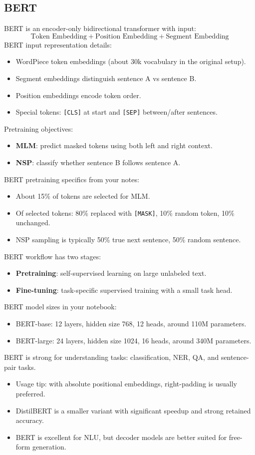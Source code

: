 \documentclass[10pt,a4paper]{article}
\begin{document}
\subsection{BERT}
BERT is an encoder-only bidirectional transformer with input:
\[
\text{Token Embedding} + \text{Position Embedding} + \text{Segment Embedding}
\]
BERT input representation details:
\begin{itemize}
    \item WordPiece token embeddings (about 30k vocabulary in the original setup).
    \item Segment embeddings distinguish sentence A vs sentence B.
    \item Position embeddings encode token order.
    \item Special tokens: \texttt{[CLS]} at start and \texttt{[SEP]} between/after sentences.
\end{itemize}
Pretraining objectives:
\begin{itemize}
    \item \textbf{MLM}: predict masked tokens using both left and right context.
    \item \textbf{NSP}: classify whether sentence B follows sentence A.
\end{itemize}
BERT pretraining specifics from your notes:
\begin{itemize}
    \item About 15\% of tokens are selected for MLM.
    \item Of selected tokens: 80\% replaced with \texttt{[MASK]}, 10\% random token, 10\% unchanged.
    \item NSP sampling is typically 50\% true next sentence, 50\% random sentence.
\end{itemize}
BERT workflow has two stages:
\begin{itemize}
    \item \textbf{Pretraining}: self-supervised learning on large unlabeled text.
    \item \textbf{Fine-tuning}: task-specific supervised training with a small task head.
\end{itemize}
BERT model sizes in your notebook:
\begin{itemize}
    \item BERT-base: 12 layers, hidden size 768, 12 heads, around 110M parameters.
    \item BERT-large: 24 layers, hidden size 1024, 16 heads, around 340M parameters.
\end{itemize}
BERT is strong for understanding tasks: classification, NER, QA, and sentence-pair tasks.
\begin{itemize}
    \item Usage tip: with absolute positional embeddings, right-padding is usually preferred.
    \item DistilBERT is a smaller variant with significant speedup and strong retained accuracy.
    \item BERT is excellent for NLU, but decoder models are better suited for free-form generation.
\end{itemize}
\end{document}
